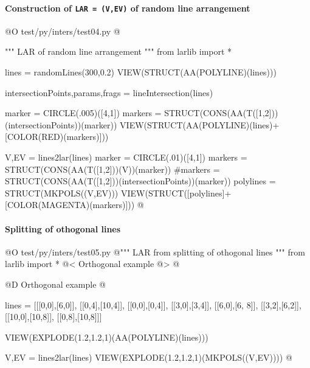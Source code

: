 \documentclass[11pt,oneside]{article}    %
\begin{document}
\paragraph{Construction of \texttt{LAR = (V,EV)} of random line arrangement}
@O test/py/inters/test04.py
@{""" LAR of random line arrangement """
from larlib import *

lines = randomLines(300,0.2)
VIEW(STRUCT(AA(POLYLINE)(lines)))

intersectionPoints,params,frags = lineIntersection(lines)

marker = CIRCLE(.005)([4,1])
markers = STRUCT(CONS(AA(T([1,2]))(intersectionPoints))(marker))
VIEW(STRUCT(AA(POLYLINE)(lines)+[COLOR(RED)(markers)]))

V,EV = lines2lar(lines)
marker = CIRCLE(.01)([4,1])
markers = STRUCT(CONS(AA(T([1,2]))(V))(marker))
#markers = STRUCT(CONS(AA(T([1,2]))(intersectionPoints))(marker))
polylines = STRUCT(MKPOLS((V,EV)))
VIEW(STRUCT([polylines]+[COLOR(MAGENTA)(markers)]))
@}


\paragraph{Splitting of othogonal lines}
@O test/py/inters/test05.py
@{""" LAR from splitting of othogonal lines """
from larlib import *
@< Orthogonal example @>
@}

@D Orthogonal example @{
lines = [[[0,0],[6,0]], [[0,4],[10,4]], [[0,0],[0,4]], [[3,0],[3,4]], 
[[6,0],[6, 8]], [[3,2],[6,2]], [[10,0],[10,8]], [[0,8],[10,8]]]

VIEW(EXPLODE(1.2,1.2,1)(AA(POLYLINE)(lines)))

V,EV = lines2lar(lines)
VIEW(EXPLODE(1.2,1.2,1)(MKPOLS((V,EV))))
@}
\end{document}

